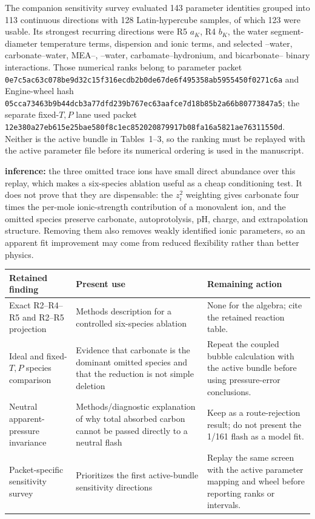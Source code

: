 \documentclass[10pt,oneside]{scrartcl}
\begin{document}
The companion sensitivity survey evaluated 143 parameter identities grouped
into 113 continuous directions with 128 Latin-hypercube samples, of which 123
were usable. Its strongest recurring directions were R5 $a_K$, R4 $b_K$, the
water segment-diameter temperature terms,  dispersion and ionic
terms, and selected --water, carbonate--water, MEA--,
--water, carbamate--hydronium, and bicarbonate-- binary
interactions. Those numerical ranks belong to parameter packet
\nolinkurl{0e7c5ac63c078be9d32c15f316ecdb2b0de67de6f495358ab5955450f0271c6a}
and Engine-wheel hash
\nolinkurl{05cca73463b9b44dcb3a77dfd239b767ec63aafce7d18b85b2a66b80773847a5};
the separate fixed-$T,P$ lane used packet
\nolinkurl{12e380a27eb615e25bae580f8c1ec852020879917b08fa16a5821ae76311550d}.
Neither is the active bundle in Tables~1--3, so the
ranking must be replayed with the active parameter file before its numerical
ordering is used in the manuscript.

\textbf{inference:} the three omitted trace ions have small direct abundance
over this replay, which makes a six-species ablation useful as a cheap
conditioning test. It does not prove that they are dispensable: the
$z_i^2$ weighting gives carbonate four times the per-mole ionic-strength
contribution of a monovalent ion, and the omitted species preserve carbonate,
autoprotolysis, pH, charge, and extrapolation structure. Removing them also
removes weakly identified ionic parameters, so an apparent fit improvement may
come from reduced flexibility rather than better physics.

\begin{center}
\small
\begin{tabularx}{\textwidth}{@{}p{}YY@{}}
\toprule
Retained finding & Present use & Remaining action \\
\midrule
Exact R2--R4--R5 and R2--R5 projection & Methods description for a controlled six-species ablation & None for the algebra; cite the retained reaction table. \\
Ideal and fixed-$T,P$ species comparison & Evidence that carbonate is the dominant omitted species and that the reduction is not simple deletion & Repeat the coupled bubble calculation with the active bundle before using pressure-error conclusions. \\
Neutral apparent-pressure invariance & Methods/diagnostic explanation of why total absorbed carbon cannot be passed directly to a neutral  flash & Keep as a route-rejection result; do not present the 1/161 flash as a model fit. \\
Packet-specific sensitivity survey & Prioritizes the first active-bundle sensitivity directions & Replay the same screen with the active parameter mapping and wheel before reporting ranks or intervals. \\
\bottomrule
\end{tabularx}
\end{center}
\end{document}
